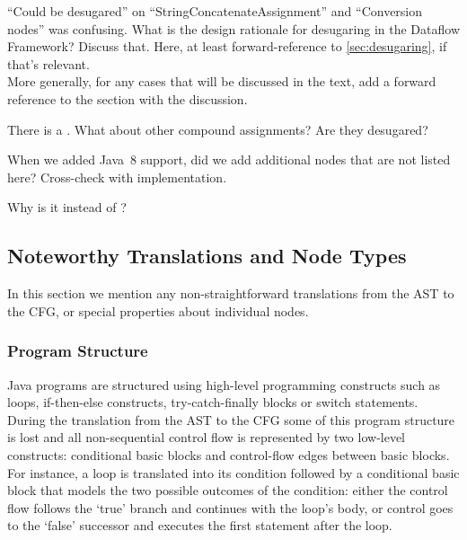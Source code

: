 \begin{workinprogress}
``Could be desugared'' on ``StringConcatenateAssignment'' and ``Conversion
nodes'' was confusing.  What is the design rationale for
desugaring in the Dataflow Framework?   Discuss that.  Here, at least
forward-reference to \autoref{sec:desugaring}, if that's relevant. \\
More generally, for any cases that will be discussed in the text, add a
forward reference to the section with the discussion.
\end{workinprogress}

\begin{workinprogress}
There is a .
What about other compound assignments? Are they desugared?
\end{workinprogress}

\begin{workinprogress}
When we added Java~8 support, did we add additional nodes that are not
listed here? Cross-check with implementation.
\end{workinprogress}

\begin{workinprogress}
Why is it  instead of ?
\end{workinprogress}


\subsection{Noteworthy Translations and Node Types}
\label{sec:noteworthy-translations}

In this section we mention any non-straightforward translations from the AST to
the CFG, or special properties about individual nodes.


\subsubsection{Program Structure}
\label{sec:prog-structure}

Java programs are structured using high-level programming constructs
such as loops, if-then-else constructs,
try-catch-finally blocks or switch statements.  During the translation
from the AST to the CFG some of this program structure is lost and all
non-sequential control flow is represented by two low-level
constructs: conditional basic blocks and control-flow edges between
basic blocks. For instance, a  loop is translated into its
condition followed by a conditional basic block that models the two
possible outcomes of the condition: either the control flow follows
the `true' branch and continues with the loop's body, or control goes to the
`false' successor and executes the first statement after the loop.



